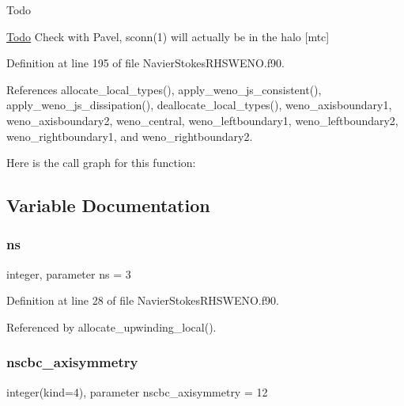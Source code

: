 \begin{DoxyRefDesc}{Todo}
\item[\hyperlink{todo__todo000003}{Todo}]Check with Pavel, sconn(1) will actually be in the halo \mbox{[}mtc\mbox{]} \end{DoxyRefDesc}


Definition at line 195 of file Navier\+Stokes\+R\+H\+S\+W\+E\+N\+O.\+f90.



References allocate\+\_\+local\+\_\+types(), apply\+\_\+weno\+\_\+js\+\_\+consistent(), apply\+\_\+weno\+\_\+js\+\_\+dissipation(), deallocate\+\_\+local\+\_\+types(), weno\+\_\+axisboundary1, weno\+\_\+axisboundary2, weno\+\_\+central, weno\+\_\+leftboundary1, weno\+\_\+leftboundary2, weno\+\_\+rightboundary1, and weno\+\_\+rightboundary2.

Here is the call graph for this function\+:


\subsection{Variable Documentation}
\hypertarget{namespacenavierstokesrhsweno_a24a7b443382b45612203c265466399d4}{}\label{namespacenavierstokesrhsweno_a24a7b443382b45612203c265466399d4} 
\subsubsection{\texorpdfstring{ns}{ns}}
{\footnotesize\ttfamily integer, parameter ns = 3}



Definition at line 28 of file Navier\+Stokes\+R\+H\+S\+W\+E\+N\+O.\+f90.



Referenced by allocate\+\_\+upwinding\+\_\+local().

\hypertarget{namespacenavierstokesrhsweno_a5d52dfb26d090fc1dd8555dbd4b41ea1}{}\label{namespacenavierstokesrhsweno_a5d52dfb26d090fc1dd8555dbd4b41ea1} 
\subsubsection{\texorpdfstring{nscbc\+\_\+axisymmetry}{nscbc\_axisymmetry}}
{\footnotesize\ttfamily integer(kind=4), parameter nscbc\+\_\+axisymmetry = 12}



